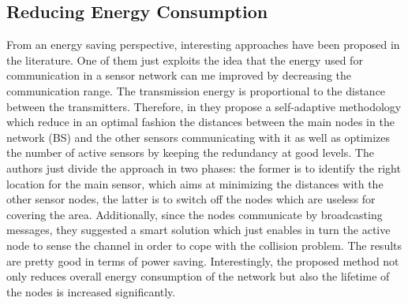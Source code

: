 \subsection*{Reducing Energy Consumption}
From an energy saving perspective, interesting approaches have been proposed in the literature. One of them just exploits the idea that the energy used for communication in a sensor network can me improved by decreasing the communication range. The transmission energy is proportional to the distance between the transmitters. Therefore, in \cite{??} they propose a self-adaptive methodology which reduce in an optimal fashion the distances between the main nodes in the network (BS) and the other sensors communicating with it as well as optimizes the number of active sensors by keeping the redundancy at good levels. 
The authors just divide the approach in two phases: the former is to identify the right location for the main sensor, which aims at minimizing the distances with the other sensor nodes, the latter is to switch off the nodes which are useless for covering the area. Additionally, since the nodes communicate by broadcasting messages, they suggested a smart solution which just enables in turn the active node to sense the channel in order to cope with the collision problem. The results are pretty good in terms of power saving. Interestingly, the proposed method not only reduces overall energy consumption of the network but also the lifetime of the nodes is increased significantly.
